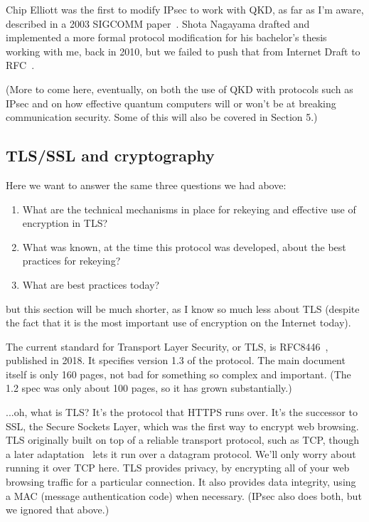 Chip Elliott was the first to modify IPsec to work with QKD, as far as
I'm aware, described in a 2003 SIGCOMM paper~\cite{elliott:qkd-net}.
Shota Nagayama drafted and implemented a more formal protocol
modification for his bachelor's thesis working with me, back in 2010,
but we failed to push that from Internet Draft to
RFC~\cite{nagayama12:_ike_for_ipsec_with_qkd}.


(More to come here, eventually, on both the use of QKD with protocols
such as IPsec and on how effective quantum computers will or won't be
at breaking communication security.  Some of this will also be covered
in Section 5.)

\subsection{TLS/SSL and cryptography}
\label{sec:tls}

Here we want to answer the same three questions we had above:

\begin{enumerate}
\item What are the technical mechanisms in place for rekeying and
   effective use of encryption in TLS?
\item What was known, at the time this protocol was developed, about
   the best practices for rekeying?
\item What are best practices today?
\end{enumerate}

but this section will be much shorter, as I know so much less about
TLS (despite the fact that it is the most important use of encryption
on the Internet today).

The current standard for Transport Layer Security, or TLS, is
RFC8446~\cite{RFC8446}, published in 2018.  It specifies version 1.3
of the protocol.  The main document itself is only 160 pages, not bad
for something so complex and important.  (The 1.2 spec was only about
100 pages, so it has grown substantially.)

...oh, what is TLS?  It's the protocol that HTTPS runs over.  It's the
successor to SSL, the Secure Sockets Layer, which was the first way to
encrypt web browsing.  TLS originally built on top of a reliable
transport protocol, such as TCP, though a later adaptation~\cite{RFC6347}
lets it run over a datagram protocol.  We'll only worry about running
it over TCP here.  TLS provides privacy, by encrypting all of your web
browsing traffic for a particular connection.  It also provides data
integrity, using a MAC (message authentication code) when necessary.
(IPsec also does both, but we ignored that above.)

